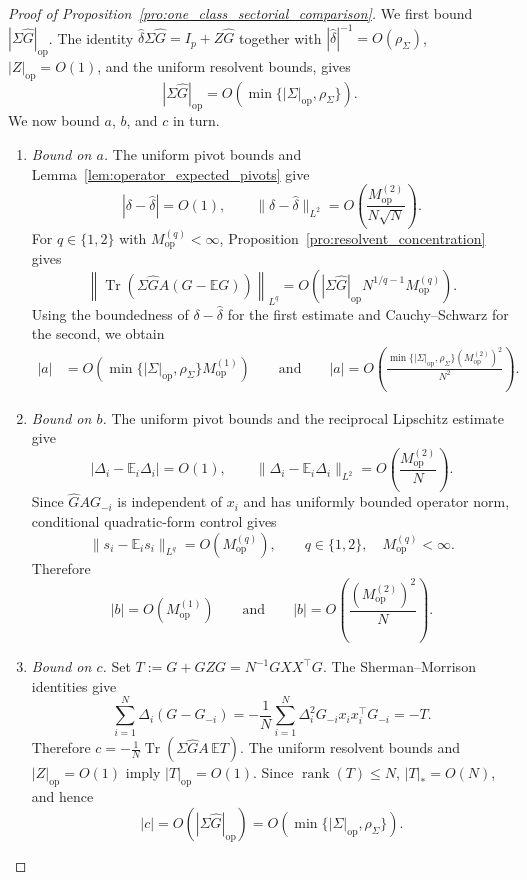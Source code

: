 \documentclass[EJP, preprint, NODS, nobera, nofontexpansion]{ejpecp}
\DeclareMathOperator{\op}{op}
\DeclareMathOperator{\tr}{Tr}
\begin{document}
\begin{proof}[Proof of Proposition~\ref{pro:one_class_sectorial_comparison}]
We first bound $|\Sigma\widehat G|_{\op}$.
The identity $\widehat\delta\Sigma\widehat G=I_p+Z\widehat G$ 
together with $|\widehat\delta|^{-1}=O(\rho_\Sigma)$,
$|Z|_{\op}=O(1)$, and the uniform resolvent bounds, gives
\begin{equation}
    |\Sigma\widehat G|_{\op}
    =O\!\left(\min\{|\Sigma|_{\op},\rho_\Sigma\}\right).
\end{equation}
We now bound $a$, $b$, and $c$ in turn.
\begin{enumerate}
    \item \emph{Bound on $a$.}
    The uniform pivot bounds and
    Lemma~\ref{lem:operator_expected_pivots} give
    \[
        |\delta-\widehat\delta|=O(1),
        \qquad
        \|\delta-\widehat\delta\|_{L^2}
        =O\!\left(\frac{M_{\op}^{(2)}}{N\sqrt N}\right).
    \]
    For $q\in\{1,2\}$ with $M_{\op}^{(q)}<\infty$,
    Proposition~\ref{pro:resolvent_concentration} gives
    \[
        \left\|
            \tr\!\left(\Sigma\widehat GA(G-\mathbb EG)\right)
        \right\|_{L^q}
        =O\!\left(
            |\Sigma\widehat G|_{\op}
            N^{1/q-1}M_{\op}^{(q)}
        \right).
    \]
    Using the boundedness of $\delta-\widehat\delta$ for the first
    estimate and Cauchy--Schwarz for the second, we obtain
    \begin{align*}
        |a|
        &=O\!\left(
            \min\{|\Sigma|_{\op},\rho_\Sigma\}M_{\op}^{(1)}
        \right)
        \qquad \text{and}\qquad
        |a|
        =O\!\left(
            \frac{
                \min\{|\Sigma|_{\op},\rho_\Sigma\}
                (M_{\op}^{(2)})^2
            }{N^2}
        \right).
    \end{align*}

    \item \emph{Bound on $b$.}
    The uniform pivot bounds and the reciprocal Lipschitz estimate give
    \[
        |\Delta_i-\mathbb E_i\Delta_i|=O(1),
        \qquad
        \|\Delta_i-\mathbb E_i\Delta_i\|_{L^2}
        =O\!\left(\frac{M_{\op}^{(2)}}N\right).
    \]
    Since $\widehat GAG_{-i}$ is independent of $x_i$ and has uniformly
    bounded operator norm, conditional quadratic-form control gives
    \[
        \|s_i-\mathbb E_i s_i\|_{L^q}=O(M_{\op}^{(q)}),
        \qquad q\in\{1,2\},\quad M_{\op}^{(q)}<\infty.
    \]
    Therefore
    \[
        |b|=O(M_{\op}^{(1)})
        \qquad \text{and}\qquad
        |b|=O\!\left(\frac{(M_{\op}^{(2)})^2}{N}\right).
    \]

    \item \emph{Bound on $c$.}
    Set $T:=G+GZG=N^{-1}GXX^\top G$.
    The Sherman--Morrison identities give
    \[
        \sum_{i=1}^N\Delta_i(G-G_{-i})
        =-\frac1N\sum_{i=1}^N
            \Delta_i^2G_{-i}x_ix_i^\top G_{-i}
        =-T.
    \]
    Therefore $c=-\frac1N\tr\!\left(\Sigma\widehat GA\,\mathbb ET\right)$.
    The uniform resolvent bounds and $|Z|_{\op}=O(1)$ imply
    $|T|_{\op}=O(1)$. Since $\operatorname{rank}(T)\leq N$,
    $|T|_*=O(N)$, and hence
    \[
        |c|=O(|\Sigma\widehat G|_{\op})
        =O\!\left(\min\{|\Sigma|_{\op},\rho_\Sigma\}\right).
    \]


\end{enumerate}
\end{proof}
\end{document}
